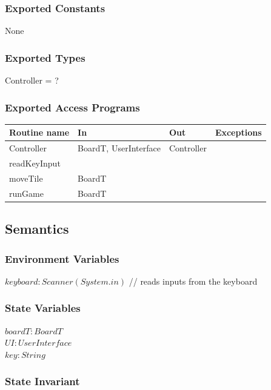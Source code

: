 \documentclass[12pt]{article}
\begin{document}
\subsubsection* {Exported Constants}

None

\subsubsection* {Exported Types}

Controller = ?

\subsubsection* {Exported Access Programs}

\begin{tabular}{| l | l | l | p{5cm} |}
  \hline
  \textbf{Routine name} & \textbf{In} & \textbf{Out} & \textbf{Exceptions}\\
  \hline
  Controller & BoardT, UserInterface & Controller & \\
  \hline
  readKeyInput & & & \\
  \hline
  moveTile & BoardT  & & \\
  \hline
  runGame & BoardT & & ~\\
  \hline

\end{tabular}

\subsection* {Semantics}

\subsubsection* {Environment Variables}
$keyboard: Scanner(System.in)$ // reads inputs from the keyboard

\subsubsection* {State Variables}
$boardT : BoardT$\\
$UI: UserInterface$\\
$key: String$\\

\subsubsection* {State Invariant}
\end{document}
